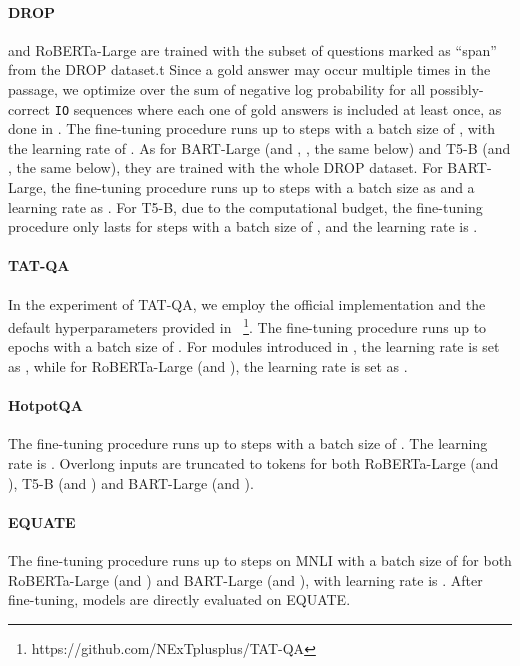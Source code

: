 \paragraph{DROP}
\oursroberta and RoBERTa-Large are trained with the subset of questions marked as ``span'' from the DROP dataset.t
Since a gold answer may occur multiple times in the passage, we optimize over the sum of negative log probability for all possibly-correct \texttt{IO} sequences where each one of gold answers is included at least once, as done in \citet{segal-etal-2020-simple}.
The fine-tuning procedure runs up to  steps with a batch size of , with the learning rate of .
As for BART-Large (and \oursbart, \oursbartmath, the same below) and T5-B (and \ourstfive, the same below), they are trained with the whole DROP dataset.
For BART-Large, the fine-tuning procedure runs up to  steps with a batch size as  and a learning rate as .
For T5-B, due to the computational budget, the fine-tuning procedure only lasts for  steps with a batch size of , and the learning rate is .


\paragraph{TAT-QA}

In the experiment of TAT-QA, we employ the official implementation and the default hyperparameters provided in \tagop~\footnote{https://github.com/NExTplusplus/TAT-QA}.
The fine-tuning procedure runs up to  epochs with a batch size of .
For modules introduced in \tagop, the learning rate is set as , while for RoBERTa-Large (and \oursroberta), the learning rate is set as .

\paragraph{HotpotQA}

The fine-tuning procedure runs up to  steps with a batch size of . The learning rate is . Overlong inputs are truncated to  tokens for both RoBERTa-Large (and \oursroberta), T5-B (and \ourstfive) and BART-Large (and \oursbart). 

\paragraph{EQUATE}
The fine-tuning procedure runs up to  steps on MNLI with a batch size of  for both RoBERTa-Large (and \oursroberta) and BART-Large (and \oursbart), with learning rate is . After fine-tuning, models are directly evaluated on EQUATE.


